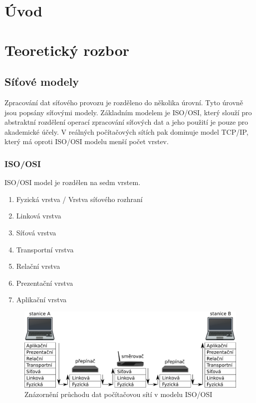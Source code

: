 \chapter{Úvod}

\chapter{Teoretický rozbor}
\section{Síťové modely}

Zpracování dat síťového provozu je rozděleno do několika úrovní. Tyto úrovně jsou popsány síťovými modely.
Základním modelem je ISO/OSI, který slouží pro abstraktní rozdělení operací zpracování síťových dat a jeho použití je
pouze pro akademické účely. V reálných počítačových sítích pak dominuje model TCP/IP, který má oproti
ISO/OSI modelu menší počet vrstev.

\subsection{ISO/OSI}
ISO/OSI model je rozdělen na sedm vrstem.

\begin{enumerate}
	\item{Fyzická vrstva / Vrstva síťového rozhraní}
	\item{Linková vrstva}
	\item{Síťová vrstva}
	\item{Transportní vrstva}
	\item{Relační vrstva}
	\item{Prezentační vrstva}
	\item{Aplikační vrstva}
\end{enumerate}

\begin{figure}[!htb]
\centering
\includegraphics[scale=.25]{fig/layers.pdf}
\caption{Znázornění průchodu dat počítačovou sítí v modelu ISO/OSI}
\label{fig:layers}
\end{figure}

